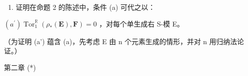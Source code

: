 
\begin{enumerate}
\def\labelenumi{\arabic{enumi}.}
\tightlist
\item
  证明在命题 2 的陈述中，条件 (a) 可代之以：
\end{enumerate}

\((a^{\prime})\operatorname{Tor}_{1}^{\mathbb{R}}(\rho_{*}(\mathbf{E}),\mathbf{F}) = 0\) ，对每个单生成右 S-模 E。

（为证明 (a') 蕴含 (a)，先考虑 E 由 n 个元素生成的情形，并对 n 用归纳法论证。）

第二章 (*)

